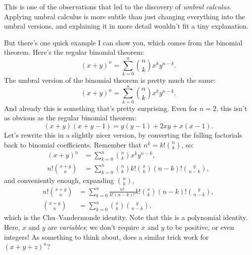 \documentclass[11pt,paper=letter]{scrartcl}
\newcommand{\ff}[1]{^{\underline{#1}}}
\begin{document}
This is one of the observations that led to the discovery of \textit{umbral calculus}. Applying umbral calculus is more subtle than just changing everything into the umbral versions, and explaining it in more detail wouldn't fit a tiny explanation.

But there's one quick example I can show you, which comes from the binomial theorem. Here's the regular binomial theorem:
\[
  (x+y)^n = \sum_{k=0}^n \binom{n}{k} x^{k} y^{n-k}.
\]
The umbral version of the binomial theorem is pretty much the same:
\[
  (x+y)\ff{n} = \sum_{k=0}^n \binom{n}{k} x\ff{k} y\ff{n-k}.
\]
And already this is something that's pretty surprising. Even for $n=2$, this isn't as obvious as the regular binomial theorem:
\[
  (x+y)(x+y-1) = y(y-1) + 2xy + x(x-1).
\]
Let's rewrite this in a slightly nicer version, by converting the falling factorials back to binomial coefficients. Remember that $n\ff{k} = k!\binom{n}{k}$, so:
\begin{align*}
(x+y)\ff{n} &= \sum_{k=0}^n \binom{n}{k} x\ff{k} y\ff{n-k}, \\
n! \binom{x+y}{n} &= \sum_{k=0}^n \binom{n}{k} k! \binom{x}{k} (n-k)! \binom{y}{n-k},
\end{align*}
and conveniently enough, expanding $\binom{n}{k}$,
\begin{align*}
n! \binom{x+y}{n} &= \sum_{k=0}^n \frac{n!}{k!(n-k)!} k! \binom{x}{k} (n-k)! \binom{y}{n-k}, \\
\binom{x+y}{n} &= \sum_{k=0}^n \binom{x}{k}\binom{y}{n-k},
\end{align*}
which is the Chu--Vandermonde identity. Note that this is a polynomial identity. Here, $x$ and $y$ are \textit{variables}; we don't require $x$ and $y$ to be positive, or even integers! As something to think about, does a similar trick work for $(x + y + z)^n$?
\end{document}
